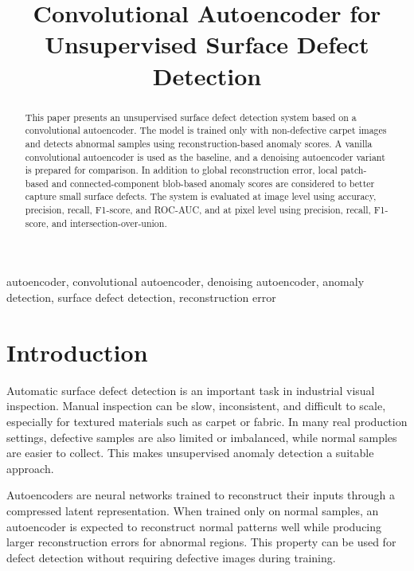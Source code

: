 \documentclass[conference]{IEEEtran}
\begin{document}
\title{Convolutional Autoencoder for Unsupervised Surface Defect Detection}

\author{
}

\maketitle

\begin{abstract}
This paper presents an unsupervised surface defect detection system based on a convolutional autoencoder. The model is trained only with non-defective carpet images and detects abnormal samples using reconstruction-based anomaly scores. A vanilla convolutional autoencoder is used as the baseline, and a denoising autoencoder variant is prepared for comparison. In addition to global reconstruction error, local patch-based and connected-component blob-based anomaly scores are considered to better capture small surface defects. The system is evaluated at image level using accuracy, precision, recall, F1-score, and ROC-AUC, and at pixel level using precision, recall, F1-score, and intersection-over-union.
\end{abstract}

\begin{IEEEkeywords}
autoencoder, convolutional autoencoder, denoising autoencoder, anomaly detection, surface defect detection, reconstruction error
\end{IEEEkeywords}

\section{Introduction}
Automatic surface defect detection is an important task in industrial visual inspection. Manual inspection can be slow, inconsistent, and difficult to scale, especially for textured materials such as carpet or fabric. In many real production settings, defective samples are also limited or imbalanced, while normal samples are easier to collect. This makes unsupervised anomaly detection a suitable approach.

Autoencoders are neural networks trained to reconstruct their inputs through a compressed latent representation. When trained only on normal samples, an autoencoder is expected to reconstruct normal patterns well while producing larger reconstruction errors for abnormal regions. This property can be used for defect detection without requiring defective images during training.
\end{document}
